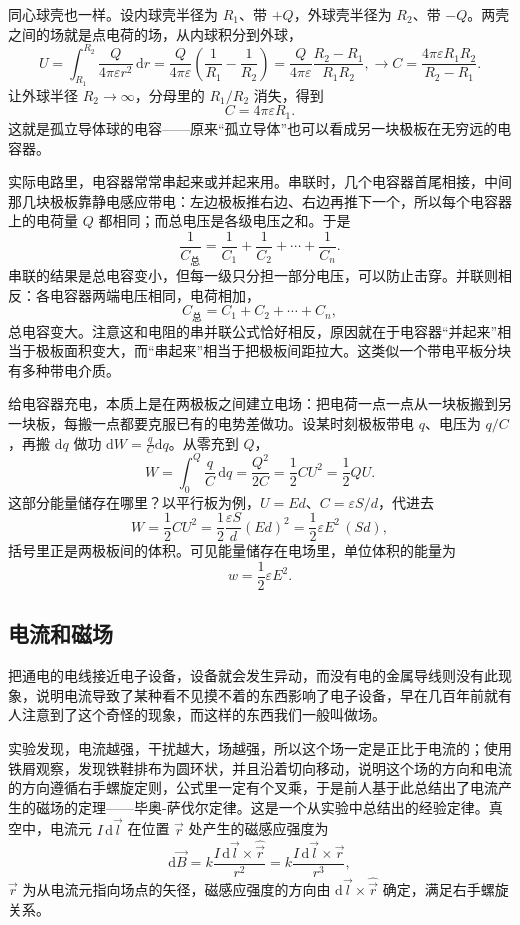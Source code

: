 \documentclass[UTF8]{ctexbook}
\begin{document}
同心球壳也一样。设内球壳半径为 \(R_1\)、带 \(+Q\)，外球壳半径为 \(R_2\)、带 \(-Q\)。两壳之间的场就是点电荷的场，从内球积分到外球，
\[
U=\int_{R_1}^{R_2}\frac{Q}{4\pi\varepsilon r^2}\,\mathrm{d}r
=\frac{Q}{4\pi\varepsilon}\left(\frac{1}{R_1}-\frac{1}{R_2}\right)
=\frac{Q}{4\pi\varepsilon}\frac{R_2-R_1}{R_1R_2},
\longrightarrow
C=\frac{4\pi\varepsilon R_1R_2}{R_2-R_1}.
\]
让外球半径 \(R_2\to\infty\)，分母里的 \(R_1/R_2\) 消失，得到
\[
C=4\pi\varepsilon R_1.
\]
这就是孤立导体球的电容——原来“孤立导体”也可以看成另一块极板在无穷远的电容器。

实际电路里，电容器常常串起来或并起来用。串联时，几个电容器首尾相接，中间那几块极板靠静电感应带电：左边极板推右边、右边再推下一个，所以每个电容器上的电荷量 \(Q\) 都相同；而总电压是各级电压之和。于是
\[
\frac{1}{C_{\text{总}}}=\frac{1}{C_1}+\frac{1}{C_2}+\cdots+\frac{1}{C_n}.
\]
串联的结果是总电容变小，但每一级只分担一部分电压，可以防止击穿。并联则相反：各电容器两端电压相同，电荷相加，
\[
C_{\text{总}}=C_1+C_2+\cdots+C_n,
\]
总电容变大。注意这和电阻的串并联公式恰好相反，原因就在于电容器“并起来”相当于极板面积变大，而“串起来”相当于把极板间距拉大。这类似一个带电平板分块有多种带电介质。

给电容器充电，本质上是在两极板之间建立电场：把电荷一点一点从一块板搬到另一块板，每搬一点都要克服已有的电势差做功。设某时刻极板带电 \(q\)、电压为 \(q/C\)，再搬 \(\mathrm{d}q\) 做功 \(\mathrm{d}W=\frac{q}{C}\mathrm{d}q\)。从零充到 \(Q\)，
\[
W=\int_0^Q\frac{q}{C}\,\mathrm{d}q=\frac{Q^2}{2C}=\frac12 CU^2=\frac12 QU.
\]
这部分能量储存在哪里？以平行板为例，\(U=Ed\)、\(C=\varepsilon S/d\)，代进去
\[
W=\frac12 CU^2=\frac12\frac{\varepsilon S}{d}(Ed)^2=\frac12\varepsilon E^2\,(Sd),
\]
括号里正是两极板间的体积。可见能量储存在电场里，单位体积的能量为
\[
w=\frac12\varepsilon E^2.
\]


\subsection{电流和磁场}

把通电的电线接近电子设备，设备就会发生异动，而没有电的金属导线则没有此现象，说明电流导致了某种看不见摸不着的东西影响了电子设备，早在几百年前就有人注意到了这个奇怪的现象，而这样的东西我们一般叫做场。

实验发现，电流越强，干扰越大，场越强，所以这个场一定是正比于电流的；使用铁屑观察，发现铁鞋排布为圆环状，并且沿着切向移动，说明这个场的方向和电流的方向遵循右手螺旋定则，公式里一定有个叉乘，于是前人基于此总结出了电流产生的磁场的定理——毕奥-萨伐尔定律。这是一个从实验中总结出的经验定律。真空中，电流元 \(I\,\mathrm{d}\vec{l}\) 在位置 \(\vec{r}\) 处产生的磁感应强度为
\[
    \mathrm{d}\vec{B}
    =k
    \frac{I\,\mathrm{d}\vec{l}\times\hat{\vec{r}}}{r^2}
    =k
    \frac{I\,\mathrm{d}\vec{l}\times\vec{r}}{r^3},
\]
\(\vec{r}\) 为从电流元指向场点的矢径，磁感应强度的方向由 \(\mathrm{d}\vec{l}\times\hat{\vec{r}}\) 确定，满足右手螺旋关系。
\end{document}

